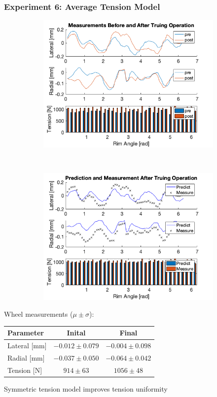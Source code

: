 \documentclass[mathserif]{beamer}
\begin{document}
\begin{frame}
\frametitle{Experiment 6: Average Tension Model}
\begin{figure}
        \centering
        \begin{subfigure}[b]{0.45\textwidth}
            \includegraphics[width=\textwidth]{exp6_pre_post}
        \end{subfigure}
        ~
        \begin{subfigure}[b]{0.45\textwidth}
            \includegraphics[width=\textwidth]{exp6_predict_measure}
        \end{subfigure}
\end{figure}
Wheel measurements ($\mu \pm \sigma$):
\centering
\begin{tabular}{| l | c | c |}
    \hline
    Parameter & Inital & Final \\ \hline
    Lateral [mm] & $-0.012\pm0.079$ &$-0.004\pm 0.098$ \\ \hline 
    Radial [mm] &$-0.037\pm0.050$& $-0.064\pm0.042$ \\ \hline 
    Tension [N] &$914\pm63$& $1056\pm48$ \\ \hline 
\end{tabular}
\begin{block}{}
    Symmetric tension model improves tension uniformity
\end{block}
\end{frame}
\end{document}
